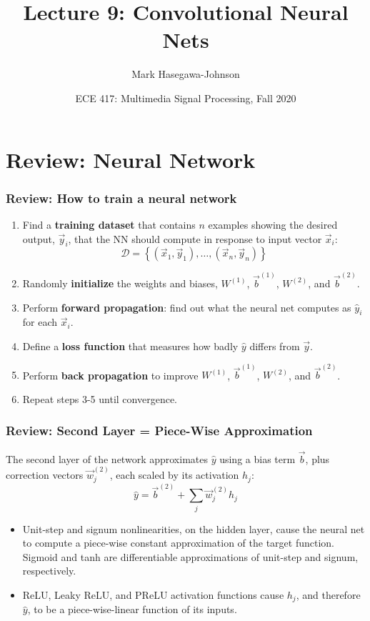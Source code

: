 \documentclass{beamer}
\title{Lecture 9: Convolutional Neural Nets}
\author{Mark Hasegawa-Johnson}
\date{ECE 417: Multimedia Signal Processing, Fall 2020}
\begin{document}
\begin{frame}
  \maketitle
\end{frame}

\begin{frame}
  \tableofcontents
\end{frame}


\section[Review]{Review: Neural Network}
\setcounter{subsection}{1}

\begin{frame}
  \frametitle{Review: How to train a neural network}
  \begin{enumerate}
  \item Find a {\bf training dataset} that contains $n$ examples showing the
    desired output, $\vec{y}_i$, that the NN should compute in
    response to input vector $\vec{x}_i$:
    \[
    {\mathcal D}=\left\{(\vec{x}_1,\vec{y}_1),\ldots,(\vec{x}_n,\vec{y}_n)\right\}
    \]
    \item Randomly {\bf initialize} the weights and biases, $W^{(1)}$,
      $\vec{b}^{(1)}$, $W^{(2)}$, and $\vec{b}^{(2)}$.
    \item Perform {\bf forward propagation}: find out what the neural
      net computes as $\hat{y}_i$ for each $\vec{x}_i$.
    \item Define a {\bf loss function} that measures
      how badly $\hat{y}$ differs from $\vec{y}$.
    \item Perform {\bf back propagation} to improve $W^{(1)}$,
      $\vec{b}^{(1)}$, $W^{(2)}$, and $\vec{b}^{(2)}$.
    \item Repeat steps 3-5 until convergence.
  \end{enumerate}
\end{frame}

\begin{frame}
  \frametitle{Review: Second Layer = Piece-Wise Approximation}

  The second layer of the network approximates $\hat{y}$ using a bias term $\vec{b}$,
  plus correction vectors $\vec{w}_j^{(2)}$, each scaled by its activation $h_j$:
  \[
  \hat{y} = \vec{b}^{(2)} + \sum_j \vec{w}_{j}^{(2)} h_j
  \]
  \begin{itemize}
  \item Unit-step and signum nonlinearities, on the hidden layer,
    cause the neural net to compute a piece-wise constant approximation
    of the target function. Sigmoid and tanh are differentiable approximations of
    unit-step and signum, respectively.
  \item ReLU, Leaky ReLU, and PReLU activation functions cause $h_j$,
    and therefore $\hat{y}$, to be a piece-wise-linear function of its
    inputs.
  \end{itemize}
\end{frame}
\end{document}
